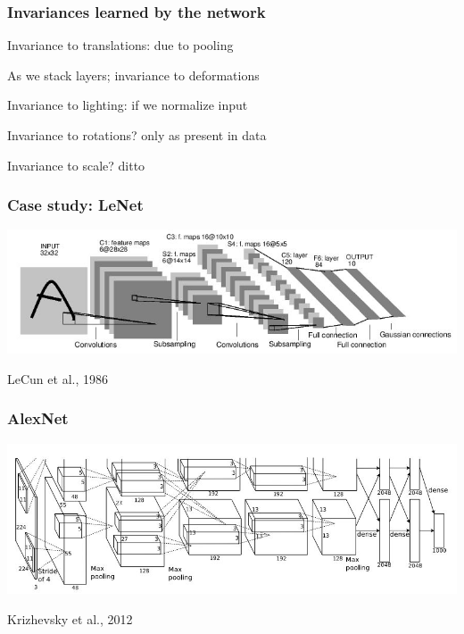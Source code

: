 \documentclass[xcolor=dvipsnames]{beamer}
\begin{document}
\begin{frame}
  \frametitle{Invariances learned by the network}
  \bi
\item Invariance to translations: due to pooling
\item As we stack layers; invariance to deformations
\item Invariance to lighting: if we normalize input
\item Invariance to rotations? only as present in data
\item Invariance to scale? ditto
\ei
\end{frame}

\begin{frame}
  \frametitle{Case study: LeNet}
\includegraphics[width=.9\textwidth]{lenet}
\bi
\item LeCun et al., 1986
\ei

\end{frame}

\begin{frame}
  \frametitle{AlexNet}
  \includegraphics[width=.9\textwidth]{alexnet}
\bi
\item Krizhevsky et al., 2012
\ei
\end{frame}
\end{document}
